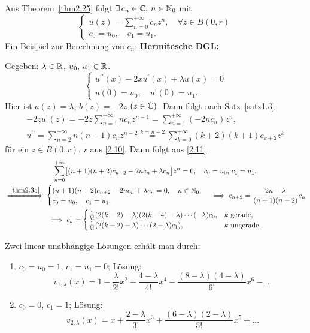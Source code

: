 \documentclass[a4paper,twoside,DIV15,BCOR12mm]{scrbook}
\begin{document}
\begin{bsp}
Aus Theorem~\ref{thm2.25} folgt $\exists\, c_n\in\mathbb{C},\, n\in\mathbb{N}_0$ mit 
\begin{equation}\label{2.10}\begin{cases}
u(z)=\sum_{n=0}^{+\infty}c_n z^n,\quad\forall z\in B(0,r)\\
c_0=u_0,\quad c_1=u_1.
\end{cases}\end{equation}
Ein Beispiel zur Berechnung von $c_n$: \textbf{Hermitesche DGL:}

Gegeben: $\lambda\in\mathbb{R}$, $u_0,\,u_1\in\mathbb{R}$.
\begin{equation}\label{2.11}\begin{cases}
u^{\prime\prime}(x)-2xu^\prime(x)+\lambda u(x)=0\\
u(0)=u_0,\quad u^\prime(0)=u_1.
\end{cases}\end{equation}
Hier ist $a(z)=\lambda$, $b(z)=-2z$ $(z\in\mathbb{C})$. Dann folgt nach Satz~\ref{satz1.3}
\begin{gather*}
-2zu^\prime(z)=-2z\sum_{n=1}^{+\infty}nc_nz^{n-1}=\sum_{n=1}^{+\infty}(-2nc_n)z^n,\\
u^{\prime\prime}=\sum_{n=2}^{+\infty}n(n-1)c_nz^{n-2}\overset{k=n-2}{=}\sum_{k=0}^{+\infty}(k+2)(k+1)c_{k+2}z^k
\end{gather*}
für ein $z\in B(0,r)$, $r$ aus \eqref{2.10}. Dann folgt aus \eqref{2.11}
\begin{gather*}
\sum_{n=0}^{+\infty}\bigl[(n+1)(n+2)c_{n+2}-2nc_n+\lambda c_n\bigr]z^n=0,\quad c_0=u_0,\,c_1=u_1.\\
\folgtwegen{\ref{thm2.35}}\begin{cases}(n+1)(n+2)c_{n+2}-2nc_n+\lambda c_n=0,\quad n\in\N_0,\\c_0=u_0,\quad c_1=u_1.\end{cases}\folgt c_{n+2}=\frac{2n-\lambda}{(n+1)(n+2)}c_n\\
\folgt c_k = \begin{cases}
\frac{1}{k!}(2(k-2)-\lambda)(2(k-4)-\lambda)\dotsm(-\lambda)c_0,&k\text{ gerade,}\\
\frac{1}{k!}(2(k-2)-\lambda)\dotsm(2-\lambda)c_1),&k\text{ ungerade.}\end{cases}
\end{gather*}

Zwei linear unabhängige Lösungen erhält man durch:

\begin{enumerate}[label=\arabic*)]
\item $c_0=u_0=1$, $c_1=u_1=0$; Lösung:
\[v_{1,\lambda}(x)=1-\frac{\lambda}{2!}x^2-\frac{4-\lambda}{4!}x^4-\frac{(8-\lambda)(4-\lambda)}{6!}x^6-\dotso\]
\item $c_0=0$, $c_1=1$; Lösung:
\[v_{2,\lambda}(x)=x+\frac{2-\lambda}{3!}x^3+\frac{(6-\lambda)(2-\lambda)}{5!}x^5+\dotso\]
\end{enumerate}


\end{bsp}
\end{document}
